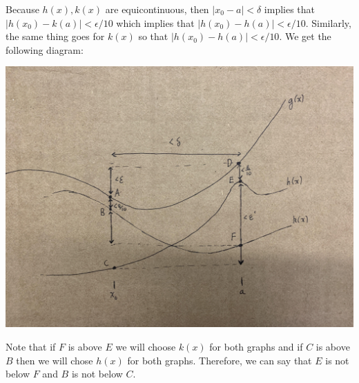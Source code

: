 \documentclass{article}
\numberwithin{equation}{section}
\begin{document}
\begin{enumerate}
\begin{enumerate}[label=(\alph*)]
        Because $h(x),k(x)$ are equicontinuous, then $|x_0-a|<\delta$ implies that $|h(x_0) - k(a)|<\epsilon/10$ which implies that $|h(x_0)-h(a)|<\epsilon/10.$ Similarly, the same thing goes for $k(x)$ so that $|h(x_0)-h(a)|<\epsilon/10.$ We get the following diagram:
        \begin{center}
            \includegraphics[width=\textwidth]{pset4_4.jpg}
        \end{center}
        Note that if $F$ is above $E$ we will choose $k(x)$ for both graphs and if $C$ is above $B$ then we will chose $h(x)$ for both graphs. Therefore, we can say that $E$ is not below $F$ and $B$ is not below $C.$
    

\end{enumerate}
\end{enumerate}
\end{document}
